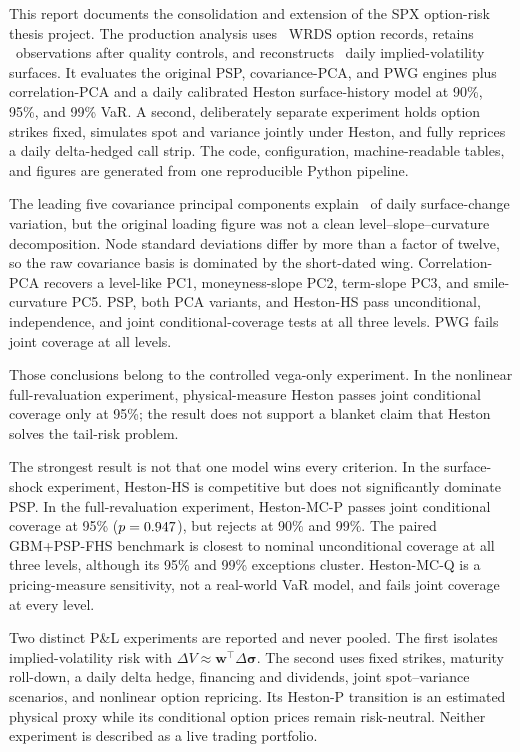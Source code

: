 \documentclass[11pt,a4paper]{article}
\begin{document}
This report documents the consolidation and extension of the SPX option-risk thesis project. The
production analysis uses \RawRows\ WRDS option records, retains \EligibleRows\ observations after
quality controls, and reconstructs \SurfaceDates\ daily implied-volatility surfaces. It evaluates the
original PSP, covariance-PCA, and PWG engines plus correlation-PCA and a daily calibrated Heston
surface-history model at 90\%, 95\%, and 99\% VaR. A second, deliberately separate experiment holds
option strikes fixed, simulates spot and variance jointly under Heston, and fully reprices a daily
delta-hedged call strip. The code, configuration, machine-readable tables, and figures are generated
from one reproducible Python pipeline.

The leading five covariance principal components explain \PCAExplained\ of daily surface-change
variation, but the original loading figure was not a clean level--slope--curvature decomposition.
Node standard deviations differ by more than a factor of twelve, so the raw covariance basis is
dominated by the short-dated wing. Correlation-PCA recovers a level-like PC1, moneyness-slope PC2,
term-slope PC3, and smile-curvature PC5. PSP, both PCA variants, and Heston-HS pass unconditional,
independence, and joint conditional-coverage tests at all three levels. PWG fails joint coverage at
all levels.

Those conclusions belong to the controlled vega-only experiment. In the nonlinear full-revaluation
experiment, physical-measure Heston passes joint conditional coverage only at 95\%; the result does
not support a blanket claim that Heston solves the tail-risk problem.

\begin{keybox}
The strongest result is not that one model wins every criterion. In the surface-shock experiment,
Heston-HS is competitive but does not significantly dominate PSP. In the full-revaluation
experiment, Heston-MC-P passes joint conditional coverage at 95\%
($p=0.947$), but rejects at 90\% and 99\%. The paired GBM+PSP-FHS benchmark is
closest to nominal unconditional coverage at all three levels, although its 95\% and 99\% exceptions
cluster. Heston-MC-Q is a pricing-measure sensitivity, not a real-world VaR model, and fails joint
coverage at every level.
\end{keybox}

\begin{warningbox}
Two distinct P\&L experiments are reported and never pooled. The first isolates implied-volatility
risk with $\Delta V\approx\bm{w}^{\top}\Delta\bm{\sigma}$. The second uses fixed strikes, maturity
roll-down, a daily delta hedge, financing and dividends, joint spot--variance scenarios, and nonlinear
option repricing. Its Heston-P transition is an estimated physical proxy while its conditional option
prices remain risk-neutral. Neither experiment is described as a live trading portfolio.
\end{warningbox}
\end{document}
